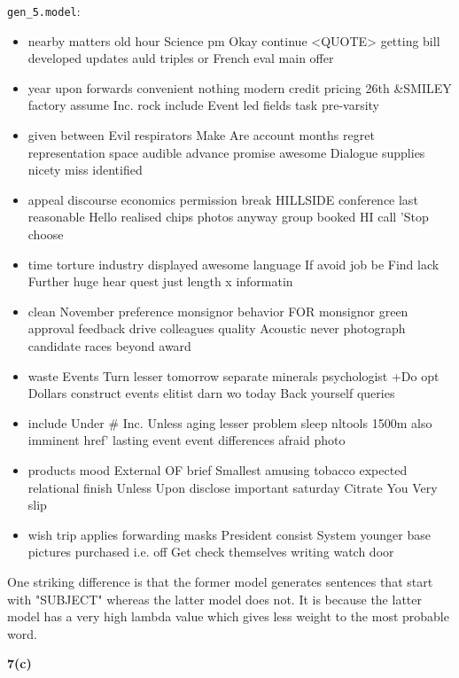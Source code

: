 \documentclass{article}
\begin{document}
\texttt{gen\_5.model}:
\begin{itemize}
	\item nearby matters old hour Science pm Okay continue <QUOTE> getting bill developed updates auld triples or French eval main offer
	\item year upon forwards convenient nothing modern credit pricing 26th \&SMILEY factory assume Inc. rock include Event led fields task pre-varsity
	\item given between Evil respirators Make Are account months regret representation space audible advance promise awesome Dialogue supplies nicety miss identified
	\item appeal discourse economics permission break HILLSIDE conference last reasonable Hello realised chips photos anyway group booked HI call 'Stop choose
	\item time torture industry displayed awesome language If avoid job be Find lack Further huge hear quest just length x informatin
	\item clean November preference monsignor behavior FOR monsignor green approval feedback drive colleagues quality Acoustic never photograph candidate races beyond award
	\item waste Events Turn lesser tomorrow separate minerals psychologist +Do opt Dollars construct events elitist darn wo today Back yourself queries
	\item include Under \# Inc. Unless aging lesser problem sleep nltools 1500m also imminent href' lasting event event differences afraid photo
	\item products mood External OF brief Smallest amusing tobacco expected relational finish Unless Upon disclose important saturday Citrate You Very slip
	\item wish trip applies forwarding masks President consist System younger base pictures purchased i.e. off Get check themselves writing watch door
\end{itemize}

One striking difference is that the former model generates sentences that start with "SUBJECT" whereas the latter model does not. It is because the latter model has a very high lambda value which gives less weight to the most probable word.

\pagebreak

\textbf{7(c)}
\end{document}
